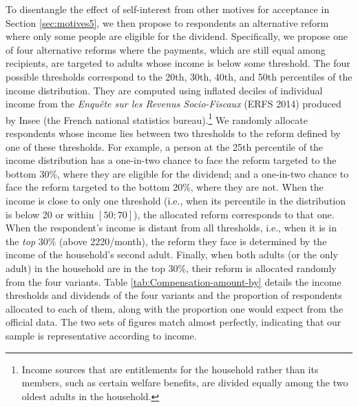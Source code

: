 \documentclass[12pt]{article} %
\begin{document}
To disentangle the effect of self-interest from other motives for acceptance in Section \ref{sec:motives5}, we then propose to respondents an alternative reform where only some people are eligible for the dividend. Specifically, we propose one of four alternative reforms where the payments, which are still equal among recipients, are targeted to adults whose income is below some threshold. The four possible thresholds correspond to the 20th, 30th, 40th, and 50th percentiles of the income distribution. They are computed using inflated deciles of individual income from the \emph{Enquête sur les Revenus Socio-Fiscaux} (ERFS 2014) produced by Insee (the French national statistics bureau).\footnote{Income sources that are entitlements for the household rather than its members, such as certain welfare benefits, are divided equally among the two oldest adults in the household.} We randomly allocate respondents whose income lies between two thresholds to the reform defined by one of these thresholds. For example, a person at the 25th percentile of the income distribution has a one-in-two chance to face the reform targeted to the bottom 30\%, where they are eligible for the dividend; and a one-in-two chance to face the reform targeted to the bottom 20\%, where they are not. When the income is close to only one threshold (i.e., when its percentile in the distribution is below 20 or within $\left[50;70\right]$), the allocated reform corresponds to that one. When the respondent's income is distant from all thresholds, i.e., when it is in the \textit{top} 30\% (above 2220\euros{}/month), the reform they face is determined by the income of the household's second adult. Finally, when both adults (or the only adult) in the household are in the top 30\%, their reform is allocated randomly from the four variants. Table \ref{tab:Compensation-amount-by} details the income thresholds and dividends of the four variants and the proportion of respondents allocated to each of them, along with the proportion one would expect from the official data. The two sets of figures match almost perfectly, indicating that our sample is representative according to income.

\end{document}

